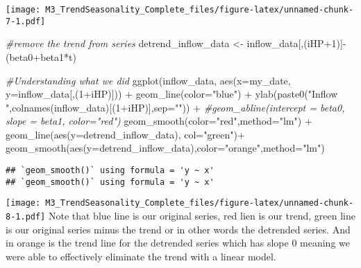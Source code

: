 \documentclass[
]{article}
\newenvironment{Shaded}{\begin{snugshade}}{\end{snugshade}}
\newcommand{\AttributeTok}[1]{\textcolor[rgb]{0.77,0.63,0.00}{#1}}
\newcommand{\CommentTok}[1]{\textcolor[rgb]{0.56,0.35,0.01}{\textit{#1}}}
\newcommand{\DecValTok}[1]{\textcolor[rgb]{0.00,0.00,0.81}{#1}}
\newcommand{\FunctionTok}[1]{\textcolor[rgb]{0.00,0.00,0.00}{#1}}
\newcommand{\NormalTok}[1]{#1}
\newcommand{\OtherTok}[1]{\textcolor[rgb]{0.56,0.35,0.01}{#1}}
\newcommand{\SpecialCharTok}[1]{\textcolor[rgb]{0.00,0.00,0.00}{#1}}
\newcommand{\StringTok}[1]{\textcolor[rgb]{0.31,0.60,0.02}{#1}}
\begin{document}
\texttt{[image: M3\_TrendSeasonality\_Complete\_files/figure-latex/unnamed-chunk-7-1.pdf]}

\begin{Shaded}
\begin{Highlighting}[]
\CommentTok{\#remove the trend from series}
\NormalTok{detrend\_inflow\_data }\OtherTok{\textless{}{-}}\NormalTok{ inflow\_data[,(iHP}\SpecialCharTok{+}\DecValTok{1}\NormalTok{)]}\SpecialCharTok{{-}}\NormalTok{(beta0}\SpecialCharTok{+}\NormalTok{beta1}\SpecialCharTok{*}\NormalTok{t)}

\CommentTok{\#Understanding what we did}
\FunctionTok{ggplot}\NormalTok{(inflow\_data, }\FunctionTok{aes}\NormalTok{(}\AttributeTok{x=}\NormalTok{my\_date, }\AttributeTok{y=}\NormalTok{inflow\_data[,(}\DecValTok{1}\SpecialCharTok{+}\NormalTok{iHP)])) }\SpecialCharTok{+}
            \FunctionTok{geom\_line}\NormalTok{(}\AttributeTok{color=}\StringTok{"blue"}\NormalTok{) }\SpecialCharTok{+}
            \FunctionTok{ylab}\NormalTok{(}\FunctionTok{paste0}\NormalTok{(}\StringTok{"Inflow "}\NormalTok{,}\FunctionTok{colnames}\NormalTok{(inflow\_data)[(}\DecValTok{1}\SpecialCharTok{+}\NormalTok{iHP)],}\AttributeTok{sep=}\StringTok{""}\NormalTok{)) }\SpecialCharTok{+}
            \CommentTok{\#geom\_abline(intercept = beta0, slope = beta1, color="red")}
            \FunctionTok{geom\_smooth}\NormalTok{(}\AttributeTok{color=}\StringTok{"red"}\NormalTok{,}\AttributeTok{method=}\StringTok{"lm"}\NormalTok{) }\SpecialCharTok{+}
            \FunctionTok{geom\_line}\NormalTok{(}\FunctionTok{aes}\NormalTok{(}\AttributeTok{y=}\NormalTok{detrend\_inflow\_data), }\AttributeTok{col=}\StringTok{"green"}\NormalTok{)}\SpecialCharTok{+}
            \FunctionTok{geom\_smooth}\NormalTok{(}\FunctionTok{aes}\NormalTok{(}\AttributeTok{y=}\NormalTok{detrend\_inflow\_data),}\AttributeTok{color=}\StringTok{"orange"}\NormalTok{,}\AttributeTok{method=}\StringTok{"lm"}\NormalTok{) }
\end{Highlighting}
\end{Shaded}

\begin{verbatim}
## `geom_smooth()` using formula = 'y ~ x'
## `geom_smooth()` using formula = 'y ~ x'
\end{verbatim}

\texttt{[image: M3\_TrendSeasonality\_Complete\_files/figure-latex/unnamed-chunk-8-1.pdf]}
Note that blue line is our original series, red lien is our trend, green
line is our original series minus the trend or in other words the
detrended series. And in orange is the trend line for the detrended
series which has slope 0 meaning we were able to effectively eliminate
the trend with a linear model.
\end{document}
